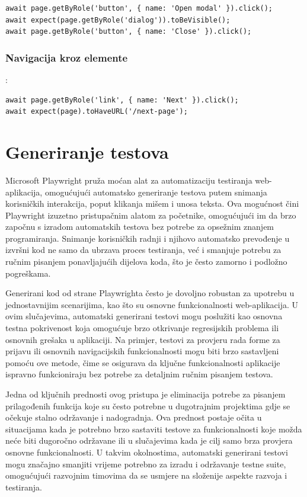 \begin{verbatim}
await page.getByRole('button', { name: 'Open modal' }).click();
await expect(page.getByRole('dialog')).toBeVisible();
await page.getByRole('button', { name: 'Close' }).click();
\end{verbatim}

\subsubsection*{Navigacija kroz elemente}:

\begin{verbatim}
await page.getByRole('link', { name: 'Next' }).click();
await expect(page).toHaveURL('/next-page');
\end{verbatim}


\section{Generiranje testova}
Microsoft Playwright pruža moćan alat za automatizaciju testiranja web-aplikacija, omogućujući automatsko generiranje testova putem snimanja korisničkih interakcija, poput klikanja mišem i unosa teksta.
Ova mogućnost čini Playwright izuzetno pristupačnim alatom za početnike, omogućujući im da brzo započnu s izradom automatskih testova bez potrebe za opsežnim znanjem programiranja.
Snimanje korisničkih radnji i njihovo automatsko prevođenje u izvršni kod ne samo da ubrzava proces testiranja, već i smanjuje potrebu za ručnim pisanjem ponavljajućih dijelova koda, što je često zamorno i podložno pogreškama.

Generirani kod od strane Playwrighta često je dovoljno robustan za upotrebu u jednostavnijim scenarijima, kao što su osnovne funkcionalnosti web-aplikacija.
U ovim slučajevima, automatski generirani testovi mogu poslužiti kao osnovna testna pokrivenost koja omogućuje brzo otkrivanje regresijskih problema ili osnovnih grešaka u aplikaciji.
Na primjer, testovi za provjeru rada forme za prijavu ili osnovnih navigacijskih funkcionalnosti mogu biti brzo sastavljeni pomoću ove metode, čime se osigurava da ključne funkcionalnosti aplikacije ispravno funkcioniraju bez potrebe za detaljnim ručnim pisanjem testova.

Jedna od ključnih prednosti ovog pristupa je eliminacija potrebe za pisanjem prilagođenih funkcija koje su često potrebne u dugotrajnim projektima gdje se očekuje stalno održavanje i nadogradnja.
Ova prednost postaje očita u situacijama kada je potrebno brzo sastaviti testove za funkcionalnosti koje možda neće biti dugoročno održavane ili u slučajevima kada je cilj samo brza provjera osnovne funkcionalnosti.
U takvim okolnostima, automatski generirani testovi mogu značajno smanjiti vrijeme potrebno za izradu i održavanje testne suite, omogućujući razvojnim timovima da se usmjere na složenije aspekte razvoja i testiranja.

